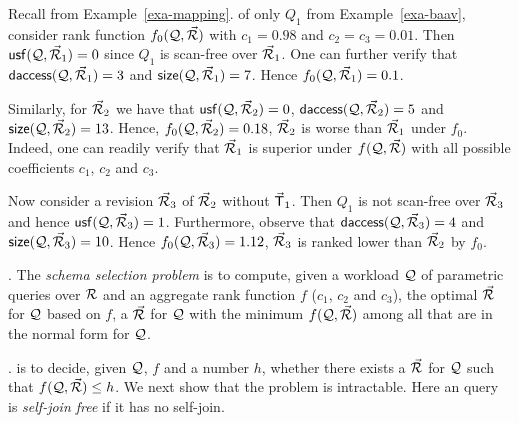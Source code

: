 \begin{example}\label{exa-measures}
Recall 
from Example~\ref{exa-mapping}.
 of only $Q_{1}$ from Example~\ref{exa-baav},
consider rank function $f_{0}(\mathcal Q, \vec{{\mathcal R}})$ with $c_{1} = 0.98$
and  $c_{2} = c_{3} = 0.01$.
%
Then ${\mathsf{usf}}(\mathcal Q, \allowbreak \vec{{\mathcal R}}_{1}) \allowbreak = \allowbreak 0$ since $Q_{1}$ is
scan-free over $\vec{{\mathcal R}}_{1}$.
One can further verify that
${\mathsf{daccess}}(\mathcal Q, \allowbreak \vec{{\mathcal R}}_{1}) \allowbreak = \allowbreak 3$ and
${\mathsf{size}}(\mathcal Q, \allowbreak \vec{{\mathcal R}}_{1}) \allowbreak = \allowbreak 7$.
Hence $f_{0}(\mathcal Q, \vec{{\mathcal R}}_{1}) = 0.1$.

\vspace{0.6ex}
Similarly, for $\vec{{\mathcal R}}_{2}$ we have that
${\mathsf{usf}}(\mathcal Q, \allowbreak \vec{{\mathcal R}}_{2})\allowbreak =\allowbreak 0$,
${\mathsf{daccess}}(\mathcal Q, \allowbreak \vec{{\mathcal R}}_{2}) \allowbreak = \allowbreak 5$ and
${\mathsf{size}}(\mathcal Q, \allowbreak \vec{{\mathcal R}}_{2}) \allowbreak = \allowbreak 13$.  Hence,
$f_{0}(\mathcal Q, \vec{{\mathcal R}}_{2}) = 0.18$, \ie $\vec{{\mathcal R}}_{2}$ is worse than
$\vec{{\mathcal R}}_{1}$ under $f_{0}$. Indeed, one can readily verify that
$\vec{{\mathcal R}}_{1}$ is superior 
under $f(\mathcal Q, \vec{{\mathcal R}})$ with all
possible coefficients $c_{1}$, $c_{2}$ and $c_{3}$.

\vspace{0.6ex}
Now consider a revision $\vec{{\mathcal R}}_{3}$ of $\vec{{\mathcal R}}_{2}$ without 
$\vec{\protect\mathsf{T}}_{1}$. Then
$Q_{1}$ is not scan-free over $\vec{{\mathcal R}}_{3}$ and hence
${\mathsf{usf}}(\mathcal Q,\allowbreak \vec{{\mathcal R}}_{3}) = 1$. Furthermore, observe that
${\mathsf{daccess}}(\mathcal Q, \allowbreak \vec{{\mathcal R}}_{3}) = 4$ and
${\mathsf{size}}(\mathcal Q, \allowbreak \vec{{\mathcal R}}_{3}) \allowbreak = \allowbreak 10$.
Hence $f_{0}(\mathcal Q,\allowbreak \vec{{\mathcal R}}_{3})\allowbreak =\allowbreak 1.12$,
\ie \bs  $\vec{{\mathcal R}}_{3}$ is ranked lower than $\vec{{\mathcal R}}_{2}$ by $f_{0}$.
\end{example}

\vspace{-0.4ex}




.
The {\em \baav schema selection problem} is to compute, given a
workload $\mathcal Q$ of parametric queries over ${\mathcal R}$ and an aggregate
rank function $f$ (\ie $c_{1}$, $c_{2}$ and $c_{3}$), the
optimal \bds $\vec{{\mathcal R}}$ for $\mathcal Q$ based on $f$, \ie a \bds
$\vec{{\mathcal R}}$ for $\mathcal Q$ with the minimum $f(\mathcal Q, \vec{{\mathcal R}})$ among all
\bdss that are in the normal form for $\mathcal Q$.


. 
is to decide, given $\mathcal Q$, $f$ and a
number $h$, whether there exists a \bds $\vec{{\mathcal R}}$ for
$\mathcal Q$ such that $f(\mathcal Q, \vec{{\mathcal R}})\leq h$.
We next show that the problem is intractable.
  Here an \SPC query 
  is {\em self-join free} if it has no self-join.


